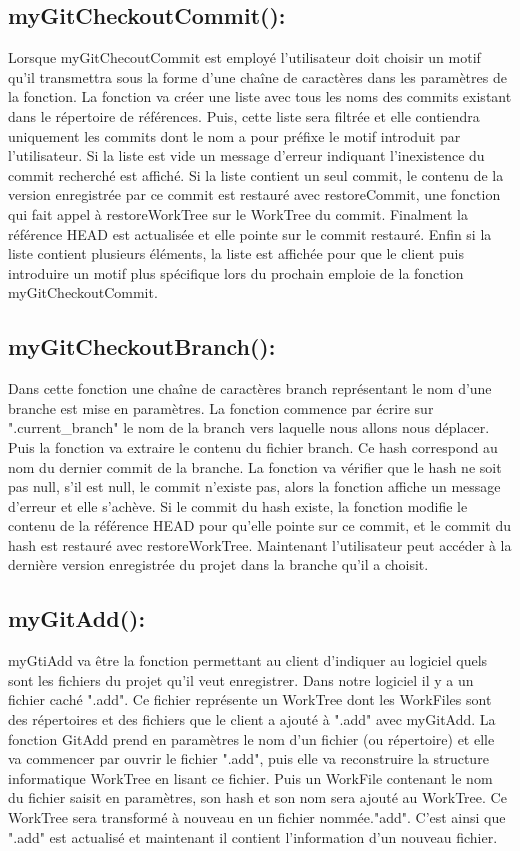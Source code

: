 \documentclass[12pt,francais]{article}
\begin{document}
\subsection{myGitCheckoutCommit():}
	Lorsque myGitChecoutCommit est employé l'utilisateur doit choisir un motif qu'il transmettra sous la forme d'une chaîne de caractères dans les paramètres de la fonction. La fonction va créer une liste avec tous les noms des commits existant dans le répertoire de références. Puis, cette liste sera filtrée et elle contiendra uniquement les commits dont le nom a pour préfixe le motif introduit par l'utilisateur. Si la liste est vide un message d'erreur indiquant l'inexistence du commit recherché est affiché. Si la liste contient un seul commit, le contenu de la version enregistrée par ce commit est restauré avec restoreCommit, une fonction qui fait appel à restoreWorkTree sur le WorkTree du commit. Finalment la référence HEAD est actualisée et elle pointe sur le commit restauré. Enfin si la liste contient plusieurs éléments, la liste est affichée pour que le client puis introduire un motif plus spécifique lors du prochain emploie de la fonction  myGitCheckoutCommit.
\subsection{myGitCheckoutBranch():}
	Dans cette fonction une chaîne de caractères branch représentant le nom d'une branche est mise en paramètres. La fonction commence par écrire sur ".current\_branch" le nom de la branch vers laquelle nous allons nous déplacer. Puis la fonction va extraire le contenu du fichier branch. Ce hash correspond au nom du dernier commit de la branche. La fonction va vérifier que le hash ne soit pas null, s'il est null, le commit n'existe pas, alors la fonction affiche un message d'erreur et elle s'achève. Si le commit du hash existe, la fonction modifie le contenu de la référence HEAD pour qu'elle pointe sur ce commit, et le commit du hash est restauré avec restoreWorkTree. Maintenant l'utilisateur peut accéder à la dernière version enregistrée du projet dans la branche qu'il a choisit.
	
\subsection{myGitAdd():}
	myGtiAdd va être la fonction permettant au client d'indiquer au logiciel quels sont les fichiers du projet qu'il veut enregistrer. Dans notre logiciel il y a un fichier caché ".add". Ce fichier représente un WorkTree dont les WorkFiles sont des répertoires et des fichiers que le client a ajouté à ".add" avec myGitAdd.
		La fonction GitAdd prend en paramètres le nom d'un fichier (ou répertoire)  et elle va commencer par ouvrir le fichier ".add", puis elle va reconstruire la structure informatique WorkTree en lisant ce fichier. Puis un WorkFile contenant le nom du fichier saisit en paramètres, son hash et son nom sera ajouté au WorkTree. Ce WorkTree sera transformé à nouveau en un fichier nommée."add". C'est ainsi que ".add" est actualisé et maintenant il contient l'information d'un nouveau fichier.
\end{document}
